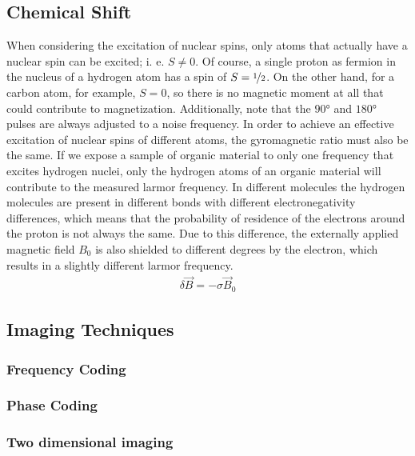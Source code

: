 \subsection{Chemical Shift}
When considering the excitation of nuclear spins, only atoms that actually have a nuclear spin can be excited; i. e. $S\neq 0$.
Of course, a single proton as fermion in the nucleus of a hydrogen atom has a spin of $S = \nicefrac{1}{2}$.
On the other hand, for a carbon atom, for example, $S = 0$, so there is no magnetic moment at all that could contribute to magnetization.
Additionally, note that the $\ang{90}$ and $\ang{180}$ pulses are always adjusted to a noise frequency.
In order to achieve an effective excitation of nuclear spins of different atoms, the gyromagnetic ratio must also be the same.
If we expose a sample of organic material to only one frequency that excites hydrogen nuclei, only the hydrogen atoms of an organic material will contribute to the measured larmor frequency.
In different molecules the hydrogen molecules are present in different bonds with different electronegativity differences, which means that the probability of residence of the electrons around the proton is not always the same.
Due to this difference, the externally applied magnetic field $B_0$ is also shielded to different degrees by the electron, which results in a slightly different larmor frequency.
\begin{align}
\delta\vec{B}=-\sigma\vec{B}_0
\end{align}



\subsection{Imaging Techniques}


\subsubsection{Frequency Coding}


\subsubsection{Phase Coding}


\subsubsection{Two dimensional imaging}